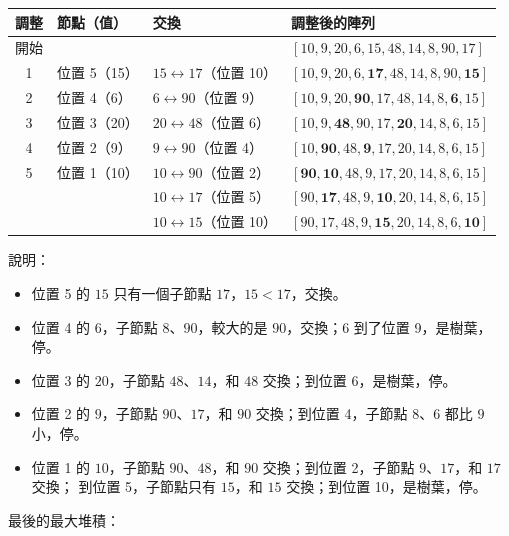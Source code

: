 \begin{pastsoln}
\begin{center}
\small
\begin{tabular}{clll}
\toprule
調整 & 節點（值） & 交換 & 調整後的陣列 \\
\midrule
開始 & & & $[10, 9, 20, 6, 15, 48, 14, 8, 90, 17]$ \\
1 & 位置 5（15） & $15 \leftrightarrow 17$（位置 10） & $[10, 9, 20, 6, \mathbf{17}, 48, 14, 8, 90, \mathbf{15}]$ \\
2 & 位置 4（6） & $6 \leftrightarrow 90$（位置 9） & $[10, 9, 20, \mathbf{90}, 17, 48, 14, 8, \mathbf{6}, 15]$ \\
3 & 位置 3（20） & $20 \leftrightarrow 48$（位置 6） & $[10, 9, \mathbf{48}, 90, 17, \mathbf{20}, 14, 8, 6, 15]$ \\
4 & 位置 2（9） & $9 \leftrightarrow 90$（位置 4） & $[10, \mathbf{90}, 48, \mathbf{9}, 17, 20, 14, 8, 6, 15]$ \\
5 & 位置 1（10） & $10 \leftrightarrow 90$（位置 2） & $[\mathbf{90}, \mathbf{10}, 48, 9, 17, 20, 14, 8, 6, 15]$ \\
  &              & $10 \leftrightarrow 17$（位置 5） & $[90, \mathbf{17}, 48, 9, \mathbf{10}, 20, 14, 8, 6, 15]$ \\
  &              & $10 \leftrightarrow 15$（位置 10） & $[90, 17, 48, 9, \mathbf{15}, 20, 14, 8, 6, \mathbf{10}]$ \\
\bottomrule
\end{tabular}
\end{center}
說明：
\begin{itemize}
\item 位置 5 的 $15$ 只有一個子節點 $17$，$15 < 17$，交換。
\item 位置 4 的 $6$，子節點 $8$、$90$，較大的是 $90$，交換；$6$ 到了位置 9，是樹葉，停。
\item 位置 3 的 $20$，子節點 $48$、$14$，和 $48$ 交換；到位置 6，是樹葉，停。
\item 位置 2 的 $9$，子節點 $90$、$17$，和 $90$ 交換；到位置 4，子節點 $8$、$6$ 都比 $9$ 小，停。
\item 位置 1 的 $10$，子節點 $90$、$48$，和 $90$ 交換；到位置 2，子節點 $9$、$17$，和 $17$ 交換；
到位置 5，子節點只有 $15$，和 $15$ 交換；到位置 10，是樹葉，停。
\end{itemize}
最後的最大堆積：
\begin{center}
\end{center}
\end{pastsoln}
